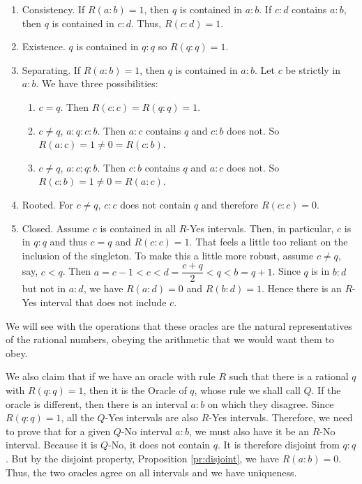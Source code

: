 \documentclass[12pt]{article}
\begin{document}
\begin{enumerate}
    \item Consistency. If $R(a:b)=1$, then $q$ is contained in $a:b$. If $c:d$ contains $a:b$, then $q$ is contained in $c:d$. Thus, $R(c:d)=1$.
    \item Existence. $q$ is contained in $q:q$ so $R(q:q)=1$.
    \item Separating. If $R(a:b) =1$, then $q$ is contained in $a : b$. Let $c$ be strictly in $a:b$. We have three possibilities: 
    \begin{enumerate}
    \item $c=q$. Then $R(c:c) = R(q:q) = 1$.
    \item $c \neq q$, $a : q : c : b$. Then $a:c$ contains $q$ and $c:b$ does not. So $R(a:c)=1 \neq 0 =R(c:b)$.
    \item $c \neq q$, $a : c : q : b$. Then $c:b$ contains $q$ and $a:c$ does not. So $R(c:b)=1 \neq 0 =R(a:c)$.
    \end{enumerate}    
    \item Rooted. For $c \neq q$, $c:c$ does not contain $q$ and therefore $R(c:c)=0$.
    \item Closed. Assume $c$ is contained in all $R$-Yes intervals. Then, in particular, $c$ is in $q:q$ and thus $c=q$ and $R(c:c)=1$. That feels a little too reliant on the inclusion of the singleton. To make this a little more robust, assume $c \neq q$, say, $c < q$. Then  $a=c-1 < c < d=\dfrac{c+q}{2} < q < b=q+1$. Since $q$ is in $b:d$ but not in $a:d$, we have $R(a:d)=0$ and $R(b:d)=1$. Hence there is an $R$-Yes interval that does not include $c$.
\end{enumerate}

We will see with the operations that these oracles are the natural representatives of the rational numbers, obeying the arithmetic that we would want them to obey.  

We also claim that if we have an oracle with rule $R$ such that there is a rational $q$ with $R(q:q)=1$, then it is the Oracle of $q$, whose rule we shall call $Q$. If the oracle is different, then there is an interval $a:b$ on which they disagree. Since $R(q:q) =1$, all the  $Q$-Yes intervals are also $R$-Yes intervals. Therefore, we need to prove that for a given  $Q$-No interval $a:b$, we must also have it be an $R$-No interval. Because it is $Q$-No, it does not contain $q$. It is therefore disjoint from $q:q$. But by the disjoint property, Proposition \ref{pr:disjoint}, we have $R(a:b)=0$. Thus, the two oracles agree on all intervals and we have uniqueness. 
\end{document}
